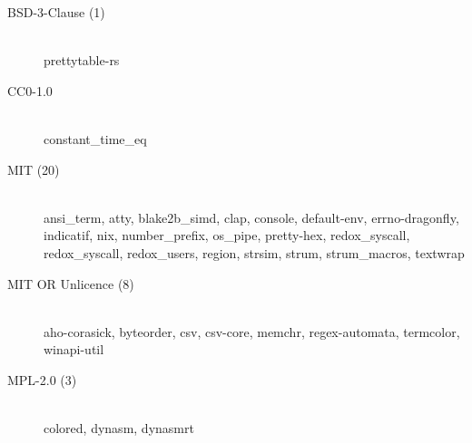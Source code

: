 \begin{description}
    \item[BSD-3-Clause (1)] \hfill \\ prettytable-rs
    \item[CC0-1.0] \hfill \\ constant\_time\_eq
    \item[MIT (20)] \hfill \\ ansi\_term, atty, blake2b\_simd, clap, console, default-env,
          errno-dragonfly, indicatif, nix, number\_prefix, os\_pipe, pretty-hex, redox\_syscall,
          redox\_syscall, redox\_users, region, strsim, strum, strum\_macros, textwrap
    \item[MIT OR Unlicence (8)] \hfill \\ aho-corasick, byteorder, csv, csv-core, memchr,
          regex-automata, termcolor, winapi-util
    \item[MPL-2.0 (3)] \hfill \\ colored, dynasm, dynasmrt
\end{description}